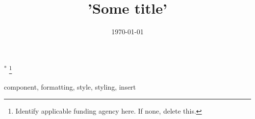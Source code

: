 \documentclass[conference]{IEEEtran}
\begin{document}
\title{'Some title'}
{\footnotesize \textsuperscript{*}
	\thanks{Identify applicable funding agency here. If none, delete this.}
}

\author{
}

\maketitle

\begin{abstract}
	
\end{abstract}

\begin{IEEEkeywords}
	component, formatting, style, styling, insert
\end{IEEEkeywords}

\begin{thebibliography}{00}
	
\end{thebibliography}

\date{\today}



\newpage
%
\end{document}
